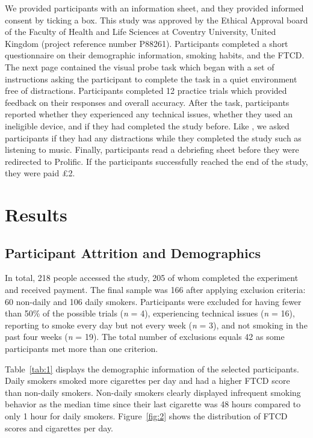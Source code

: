 \documentclass[empirical, authordate]{jote-new-article}
\begin{document}
We provided participants with an information sheet, and they provided informed consent by ticking a box. This study was approved by the Ethical Approval board of the Faculty of Health and Life Sciences at Coventry University, United Kingdom (project reference number P88261). Participants completed a short questionnaire on their demographic information, smoking habits, and the FTCD. The next page contained the visual probe task which began with a set of instructions asking the participant to complete the task in a quiet environment free of distractions. Participants completed 12 practice trials which provided feedback on their responses and overall accuracy. After the task, participants reported whether they experienced any technical issues, whether they used an ineligible device, and if they had completed the study before. Like \textcite{Clifford2014}, we asked participants if they had any distractions while they completed the study such as listening to music. Finally, participants read a debriefing sheet before they were redirected to Prolific. If the participants successfully reached the end of the study, they were paid £2.

\section{Results}

\subsection{Participant Attrition and Demographics}

In total, 218 people accessed the study, 205 of whom completed the experiment and received payment. The final sample was 166 after applying exclusion criteria: 60 non-daily and 106 daily smokers. Participants were excluded for having fewer than 50\% of the possible trials (\emph{n} = 4), experiencing technical issues (\emph{n} = 16), reporting to smoke every day but not every week (\emph{n} = 3), and not smoking in the past four weeks (\emph{n} = 19). The total number of exclusions equals 42 as some participants met more than one criterion.

Table~\ref{tab:1} displays the demographic information of the selected participants. Daily smokers smoked more cigarettes per day and had a higher FTCD score than non-daily smokers. Non-daily smokers clearly displayed infrequent smoking behavior as the median time since their last cigarette was 48 hours compared to only 1 hour for daily smokers. Figure~\ref{fig:2} shows the distribution of FTCD scores and cigarettes per day.
\end{document}
